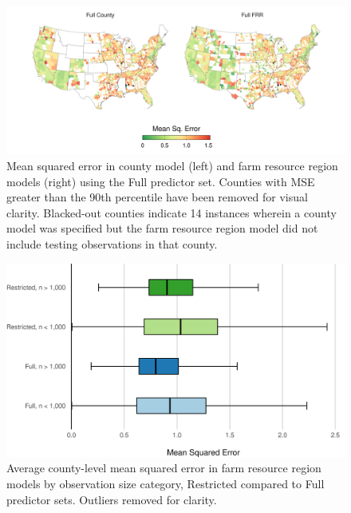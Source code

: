 \documentclass[12pt]{article}
\begin{document}
\begin{figure}[H]
    \centering
    \includegraphics[width=1\textwidth]{exhibits/compare_ffb_fcb_mse.png}
    \caption{Mean squared error in county model (left) and farm resource region models (right) using the Full predictor set. Counties with MSE greater than the 90th percentile have been removed for visual clarity. Blacked-out counties indicate 14 instances wherein a county model was specified but the farm resource region model did not include testing observations in that county.}
    \label{fig:compare_ffb_fcb_mse}
\end{figure}

\begin{figure}[H]
    \centering
    \includegraphics[width=1\textwidth]{exhibits/frr_compare_mse_size.png}
    \caption{Average county-level mean squared error in farm resource region models by observation size category, Restricted compared to Full predictor sets. Outliers removed for clarity.}
    \label{fig:frr_compare_mse_size}
\end{figure}



\newpage
\newpage

\vspace*{200pt}
\end{document}
